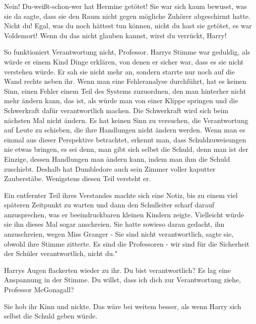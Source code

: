 \glqq{}Nein! Du-weißt-schon-wer hat Hermine getötet!\grqq{} Sie war sich kaum
bewusst, was sie da sagte, dass sie den Raum nicht gegen mögliche Zuhörer
abgeschirmt hatte. \glqq{}Nicht du! Egal, was du noch hättest tun können, nicht
du hast sie getötet, es war Voldemort! Wenn du das nicht glauben kannst, wirst
du verrückt, Harry!\grqq{}

\glqq{}So funktioniert Verantwortung nicht, Professor.\grqq{} Harrys Stimme war
geduldig, als würde er einem Kind Dinge erklären, von denen er sicher war, dass
es sie nicht verstehen würde. Er sah sie nicht mehr an, sondern starrte nur noch
auf die Wand rechts neben ihr. \glqq{}Wenn man eine Fehleranalyse durchführt, hat
es keinen Sinn, einen Fehler einem Teil des Systems zuzuordnen, den man
hinterher nicht mehr ändern kann, das ist, als würde man von einer Klippe
springen und die Schwerkraft dafür verantwortlich machen. Die Schwerkraft wird
sich beim nächsten Mal nicht ändern. Es hat keinen Sinn zu versuchen, die
Verantwortung auf Leute zu schieben, die ihre Handlungen nicht ändern werden.
Wenn man es einmal aus dieser Perspektive betrachtet, erkennt man, dass
Schuldzuweisungen nie etwas bringen, es sei denn, man gibt sich selbst die
Schuld, denn man ist der Einzige, dessen Handlungen man ändern kann, indem man
ihm die Schuld zuschiebt. Deshalb hat Dumbledore auch sein Zimmer voller
kaputter Zauberstäbe. Wenigstens diesen Teil versteht er.\grqq{}

Ein entfernter Teil ihres Verstandes machte sich eine Notiz, bis zu einem viel
späteren Zeitpunkt zu warten und dann den Schulleiter scharf darauf
anzusprechen, was er beeindruckbaren kleinen Kindern zeigte. Vielleicht würde
sie ihn dieses Mal sogar anschreien. Sie hatte sowieso daran gedacht, ihn
anzuschreien, wegen Miss Granger - \glqq{}Sie sind nicht verantwortlich\grqq{},
sagte sie, obwohl ihre Stimme zitterte. \glqq{}Es sind die Professoren - wir sind
für die Sicherheit der Schüler verantwortlich, nicht du."

Harrys Augen flackerten wieder zu ihr. \glqq{}Du bist verantwortlich?\grqq{} Es
lag eine Anspannung in der Stimme. \glqq{}Du willst, dass ich dich zur
Verantwortung ziehe, Professor McGonagall?\grqq{}

Sie hob ihr Kinn und nickte. Das wäre bei weitem besser, als wenn Harry sich
selbst die Schuld geben würde.

